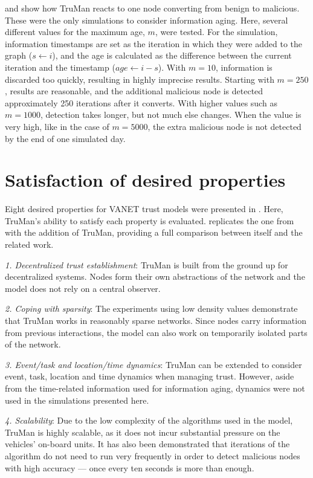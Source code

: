 \pagebreak
{} and  show how TruMan reacts to one node converting from benign to malicious.
These were the only simulations to consider information aging.
Here, several different values for the maximum age, $m$, were tested.
For the simulation, information timestamps are set as the iteration in which they were added to the graph ($s \gets i$), and the age is calculated as the difference between the current iteration and the timestamp ($age \gets i - s$).
With $m=10$, information is discarded too quickly, resulting in highly imprecise results.
Starting with $m=250$, results are reasonable, and the additional malicious node is detected approximately 250 iterations after it converts.
With higher values such as $m=1000$, detection takes longer, but not much else changes. 
When the value is very high, like in the case of $m=5000$, the extra malicious node is not detected by the end of one simulated day.



\section{Satisfaction of desired properties}
\label{section:satisfaction}

Eight desired properties for VANET trust models were presented in .
Here, TruMan's ability to satisfy each property is evaluated.
 replicates the one from  with the addition of TruMan, providing a full comparison between itself and the related work.

\textit{1. Decentralized trust establishment}:
TruMan is built from the ground up for decentralized systems.
Nodes form their own abstractions of the network and the model does not rely on a central observer.

\textit{2. Coping with sparsity}:
The experiments using low density values demonstrate that TruMan works in reasonably sparse networks.
Since nodes carry information from previous interactions, the model can also work on temporarily isolated parts of the network.

\textit{3. Event/task and location/time dynamics}:
TruMan can be extended to consider event, task, location and time dynamics when managing trust.
However, aside from the time-related information used for information aging, dynamics were not used in the simulations presented here.

\textit{4. Scalability}: 
Due to the low complexity of the algorithms used in the model, TruMan is highly scalable, as it does not incur substantial pressure on the vehicles' on-board units.
It has also been demonstrated that iterations of the algorithm do not need to run very frequently in order to detect malicious nodes with high accuracy --- once every ten seconds is more than enough.

